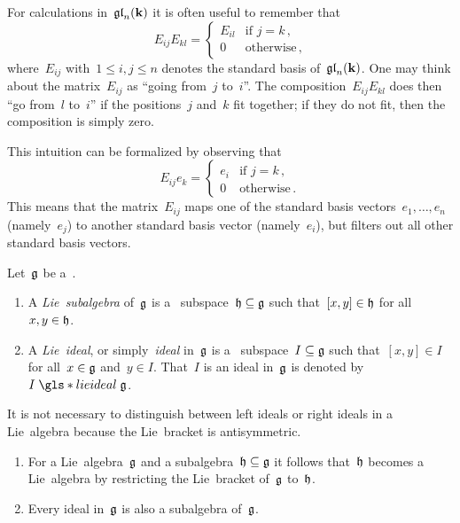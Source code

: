\begin{recall}
  For calculations in~$\mathfrak{gl}_n(\mathbf{k})$ it is often useful to remember that
  \[
    E_{ij} E_{kl}
    =
    \begin{cases}
      E_{il}  & \text{if~$j = k$} \,, \\
      0       & \text{otherwise}  \,,
    \end{cases}
  \]
  where~$E_{ij}$ with~$1 \leq i,j \leq n$ denotes the standard basis of~$\mathfrak{gl}_n(\mathbf{k})$.
  One may think about the matrix~$E_{ij}$ as \enquote{going from~$j$ to~$i$}.
  The composition~$E_{ij} E_{kl}$ does then \enquote{go from~$l$ to~$i$} if the positions~$j$ and~$k$ fit together;
  if they do not fit, then the composition is simply zero.
  
  This intuition can be formalized by observing that
  \[
    E_{ij} e_k
    =
    \begin{cases}
      e_i & \text{if~$j = k$} \,, \\
      0   & \text{otherwise}  \,.
    \end{cases}
  \]
  This means that the matrix~$E_{ij}$ maps one of the standard basis vectors~$e_1, \dotsc, e_n$ (namely~$e_j$) to another standard basis vector (namely~$e_i$), but filters out all other standard basis vectors.
\end{recall}



\begin{definition}
  Let~$\mathfrak{g}$ be a~{\liealgebra{$\kf$}}.
  \begin{enumerate}
    \item
      A \emph{Lie~subalgebra} of~$\mathfrak{g}$ is a~{\linear{$\kf$}} subspace~$\mathfrak{h} \subseteq \mathfrak{g}$ such that~$[x,y] \in \mathfrak{h}$ for all~$x, y \in \mathfrak{h}$.
    \item
      A \emph{Lie~ideal}, or simply~\emph{ideal} in~$\mathfrak{g}$ is a~{\linear{$\kf$}} subspace~$I \subseteq \mathfrak{g}$ such that~$[x,y] \in I$ for all~$x \in \mathfrak{g}$ and~$y \in I$.
      That~$I$ is an ideal in~$\mathfrak{g}$ is denoted by~$I \mathrel{\gls*{lie ideal}} \glie$.
  \end{enumerate}
\end{definition}


\begin{remark}
  It is not necessary to distinguish between left ideals or right ideals in a Lie~algebra because the Lie~bracket is antisymmetric.
\end{remark}


\begin{remark}
  \leavevmode
  \begin{enumerate}
    \item
      For a Lie~algebra~$\mathfrak{g}$ and a subalgebra~$\mathfrak{h} \subseteq \mathfrak{g}$ it follows that~$\mathfrak{h}$ becomes a Lie~algebra by restricting the Lie~bracket of~$\mathfrak{g}$ to~$\mathfrak{h}$.
    \item
      Every ideal in~$\mathfrak{g}$ is also a subalgebra of~$\mathfrak{g}$.
  \end{enumerate}
\end{remark}



